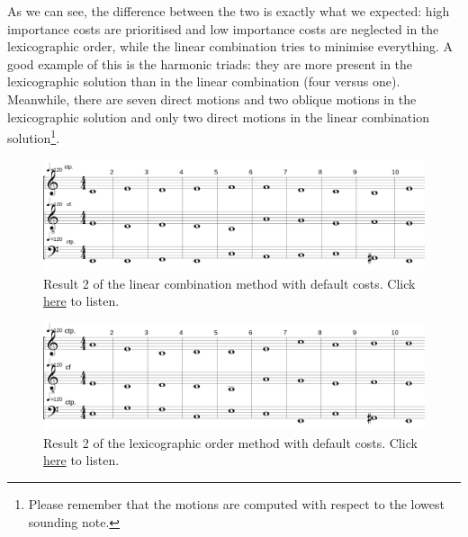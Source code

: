 As we can see, the difference between the two is exactly what we expected: high importance costs are prioritised and low importance costs are neglected in the lexicographic order, while the linear combination tries to minimise everything. A good example of this is the harmonic triads: they are more present in the lexicographic solution than in the linear combination (four versus one). Meanwhile, there are seven direct motions and two oblique motions in the lexicographic solution and only two direct motions in the linear combination solution\footnote{Please remember that the motions are computed with respect to the lowest sounding note.}.

\begin{figure}[h]
    \centering
    \includegraphics[width=1\textwidth]{Images/Experiments/linear-combination-1sp0.png}
    \caption{Result 2 of the linear combination method with default costs. Click \href{https://youtu.be/pnwceQyZd9E}{here} to listen.}
    \label{fig:combili-1sp0}
\end{figure}

\begin{figure}[h]
    \centering
    \includegraphics[width=1\textwidth]{Images/Experiments/basic-lexico-1sp0.png}
    \caption{Result 2 of the lexicographic order method with default costs. Click \href{https://youtu.be/-twWU-hNcYI}{here} to listen.}
    \label{fig:lexico-1sp0}
\end{figure}

